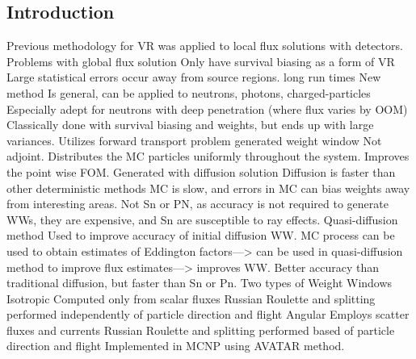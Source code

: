 \documentclass{report}
\begin{document}
\subsection{Introduction}
\begin{outline}
  \1 Previous methodology for VR was applied to local flux solutions with detectors. 
  \1 Problems with global flux solution
    \2 Only have survival biasing as a form of VR
      \3 Large statistical errors occur away from source regions. 
      \3 long run times
  \1 New method
    \2 Is general, can be applied to neutrons, photons, charged-particles
    \2 Especially adept for neutrons with deep penetration (where flux varies by OOM)
      \3 Classically done with survival biasing and weights, but ends up with large variances. 
    \2 Utilizes forward transport problem generated weight window
      \3 Not adjoint. 
      \3 Distributes the MC particles uniformly throughout the system. 
      \3 Improves the point wise FOM. 
      \3 Generated with diffusion solution
        \4 Diffusion is faster than other deterministic methods
        \4 MC is slow, and errors in MC can bias weights away from interesting areas. 
        \4 Not Sn or PN, as accuracy is not required to generate WWs, they are expensive, and Sn are susceptible to ray effects. 
    \2 Quasi-diffusion method
      \3 Used to improve accuracy of initial diffusion WW. 
        \4 MC process can be used to obtain estimates of Eddington factors—> can be used in quasi-diffusion method to improve flux estimates—> improves WW. 
      \3 Better accuracy than traditional diffusion, but faster than Sn or Pn. 
    \2 Two types of Weight Windows 
      \3 Isotropic
        \4 Computed only from scalar fluxes
        \4 Russian Roulette and splitting performed independently of particle direction and flight
      \3 Angular
        \4 Employs scatter fluxes and currents
        \4 Russian Roulette and splitting performed based of particle direction and flight
        \4 Implemented in MCNP using AVATAR method. 
\end{outline}
\end{document}
